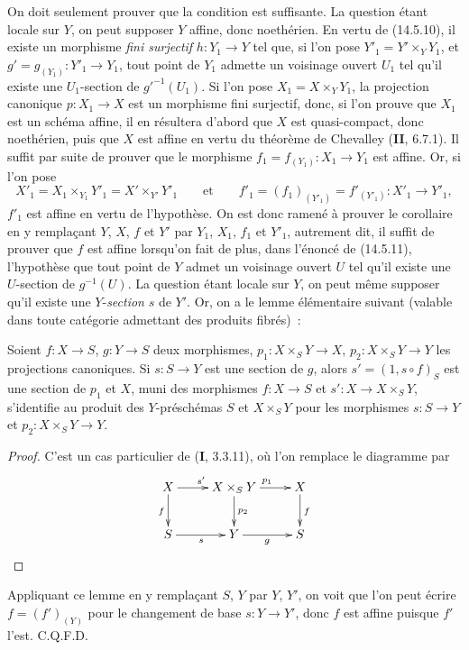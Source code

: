 On doit seulement prouver que la condition est suffisante. La question étant locale
sur $Y$, on peut supposer $Y$ affine, donc noethérien. En vertu de (14.5.10), il
existe un morphisme \emph{fini surjectif} $h:Y_1\to Y$ tel que, si l'on pose
$Y'_1=Y'\times_Y Y_1$, et $g'=g_{(Y_1)}:Y'_1\to Y_1$, tout point de $Y_1$ admette
un voisinage ouvert $U_1$ tel qu'il existe une $U_1$-section de $g'^{-1}(U_1)$. Si
l'on pose $X_1=X\times_Y Y_1$, la projection canonique $p:X_1\to X$ est un
morphisme fini surjectif, donc, si l'on prouve que $X_1$ est un schéma affine, il en
résultera d'abord que $X$ est quasi-compact, donc noethérien, puis que $X$ est affine
en vertu du théorème de Chevalley (\textbf{II}, 6.7.1). Il suffit par suite de
prouver que le morphisme $f_1=f_{(Y_1)}:X_1\to Y_1$ est affine. Or, si l'on pose
\[
  X'_1=X_1\times_{Y_1}Y'_1=X'\times_{Y'}Y'_1
  \qquad\text{et}\qquad
  f'_1=(f_1)_{(Y'_1)}=f'_{(Y'_1)}:X'_1\to Y'_1,
\]
$f'_1$ est affine en vertu de l'hypothèse. On est donc ramené à prouver le corollaire
en y remplaçant $Y$, $X$, $f$ et $Y'$ par $Y_1$, $X_1$, $f_1$ et $Y'_1$,
autrement dit, il suffit de prouver que $f$ est affine lorsqu'on fait de plus, dans
l'énoncé de (14.5.11), l'hypothèse que tout point de $Y$ admet un voisinage ouvert
$U$ tel qu'il existe une $U$-section de $g^{-1}(U)$. La question étant locale sur
$Y$, on peut même supposer qu'il existe une $Y$-\emph{section} $s$ de $Y'$. Or, on a le
lemme élémentaire suivant (valable dans toute catégorie admettant des produits
fibrés)~:

\begin{lemma}[14.5.11.1]
\label{IV.14.5.11.1-fr}
Soient $f:X\to S$, $g:Y\to S$ deux morphismes, $p_1:X\times_S Y\to X$,
$p_2:X\times_S Y\to Y$ les projections canoniques. Si $s:S\to Y$ est une section
de $g$, alors $s'=(1,s\circ f)_S$ est une section de $p_1$ et $X$, muni des
morphismes $f:X\to S$ et $s':X\to X\times_S Y$, s'identifie au produit des
$Y$-préschémas $S$ et $X\times_S Y$ pour les morphismes $s:S\to Y$ et
$p_2:X\times_S Y\to Y$.
\end{lemma}


\begin{proof}
C'est un cas particulier de (\textbf{I}, 3.3.11), où l'on remplace le diagramme par
\[
  \xymatrix{
    X \ar[r]^{s'} \ar[d]_{f} & X\times_S Y \ar[r]^{p_1} \ar[d]^{p_2} & X \ar[d]^{f} \\
    S \ar[r]_{s} & Y \ar[r]_{g} & S
  }
\]
\end{proof}
\noindent Appliquant ce lemme en y remplaçant $S$, $Y$ par $Y$, $Y'$, on voit que l'on peut
écrire $f=(f')_{(Y)}$ pour le changement de base $s:Y\to Y'$, donc $f$ est affine
puisque $f'$ l'est. C.Q.F.D.

